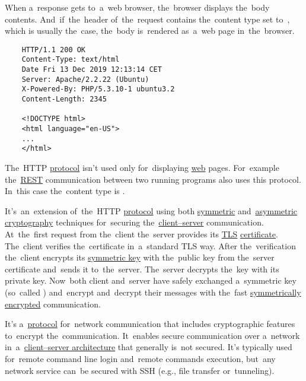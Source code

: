 When a~response gets to~a~web browser, the~browser displays the~body contents.
And~if~the~header of~the~request contains the~content type set to~, which is usually the~case, the~body is~rendered as~a~web page in~the~browser.

\begin{lstlisting}
    HTTP/1.1 200 OK
    Content-Type: text/html
    Date Fri 13 Dec 2019 12:13:14 CET
    Server: Apache/2.2.22 (Ubuntu)
    X-Powered-By: PHP/5.3.10-1 ubuntu3.2
    Content-Length: 2345

    <!DOCTYPE html>
    <html language="en-US">
    ...
    </html>
\end{lstlisting}
\notenonl The~HTTP \hyperref[protocolstandard]{protocol} isn't used only for~displaying \hyperref[internetweb]{web} pages.
For~example the~\hyperref[rest]{REST} communication between two running programs also uses this protocol.
In~this case the~content type is .

\label{https}
It's~an~extension of~the~HTTP \hyperref[protocolstandard]{protocol} using both \hyperref[symmetriccryptography]{symmetric} and~\hyperref[asymmetriccryptography]{asymmetric} \hyperref[cryptography]{cryptography} techniques for~securing the~\hyperref[clientserverarchitecture]{client--server} communication.
At~the~first request from the~client the~server provides its \hyperref[tls]{TLS} \hyperref[certificate]{certificate}.
The~client verifies the~certificate in~a~standard TLS way.
After the~verification the~client encrypts its \hyperref[symmetriccryptography]{symmetric key} with the~public key from the~server certificate and~sends it to~the~server.
The~server decrypts the~key with its private key.
Now~both client and~server have safely exchanged a~symmetric key (so~called ) and~encrypt and~decrypt their messages with the~fast \hyperref[symmetriccryptography]{symmetrically encrypted} communication.

\label{smtp}

\label{ssh}
It's a~\hyperref[protocolstandard]{protocol} for~network communication that includes cryptographic features to~encrypt the~communication.
It~enables secure communication over a~network in~a~\hyperref[clientserverarchitecture]{client--server architecture} that generally is~not secured.
It's typically used for~remote command line login and~remote commands execution, but~any network service can~be secured with SSH (e.g., file transfer or~tunneling).

